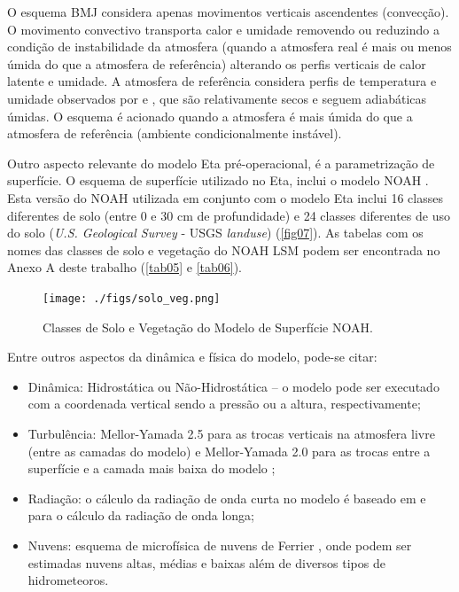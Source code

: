 O esquema BMJ considera apenas movimentos verticais ascendentes (convecção). O movimento convectivo transporta calor e umidade removendo ou reduzindo a condição de instabilidade da atmosfera (quando a atmosfera real é mais ou menos úmida do que a atmosfera de referência) alterando os perfis verticais de calor latente e umidade. A atmosfera de referência considera perfis de temperatura e umidade observados por  e , que são relativamente secos e seguem adiabáticas úmidas. O esquema é acionado quando a atmosfera é mais úmida do que a atmosfera de referência (ambiente condicionalmente instável).

Outro aspecto relevante do modelo Eta pré-operacional, é a parametrização de superfície. O esquema de superfície utilizado no Eta, inclui o modelo NOAH \cite{mitchelletal01}. Esta versão do NOAH utilizada em conjunto com o modelo Eta  inclui 16 classes diferentes de solo (entre 0 e 30 cm de profundidade) e 24 classes diferentes de uso do solo (\textit{U.S. Geological Survey} - USGS \textit{landuse}) (\autoref{fig07}). As tabelas com os nomes das classes de solo e vegetação do NOAH LSM podem ser encontrada no Anexo A deste trabalho (\autoref{tab05} e \autoref{tab06}).

\begin{figure}[!hpb]
\centering
\texttt{[image: ./figs/solo\_veg.png]}
\caption{Classes de Solo e Vegetação do Modelo de Superfície NOAH.}
\label{fig07}
\end{figure}

Entre outros aspectos da dinâmica e física do modelo, pode-se citar:
 
\begin{itemize}
\item Dinâmica: Hidrostática ou Não-Hidrostática – o modelo pode ser executado com a coordenada vertical sendo a pressão ou a altura, respectivamente;
\item Turbulência: Mellor-Yamada 2.5 para as trocas verticais na atmosfera livre (entre as camadas do modelo) e Mellor-Yamada 2.0 para as trocas entre a superfície e a camada mais baixa do modelo \cite{melloryamada74};
\item Radiação: o cálculo da radiação de onda curta no modelo é baseado em  e  para o cálculo da radiação de onda longa;
\item Nuvens: esquema de microfísica de nuvens de Ferrier \cite{ferrieretal02}, onde podem ser estimadas nuvens altas, médias e baixas além de diversos tipos de hidrometeoros.
\end{itemize}

